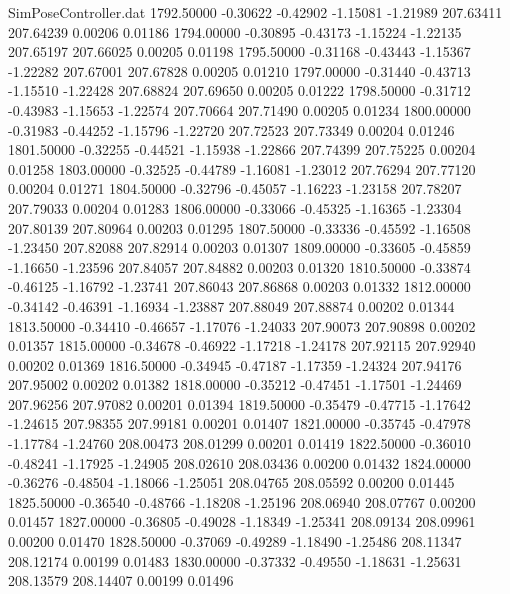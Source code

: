 \begin{filecontents}{SimPoseController.dat}
1792.50000   -0.30622   -0.42902    -1.15081   -1.21989  207.63411  207.64239    0.00206    0.01186
1794.00000   -0.30895   -0.43173    -1.15224   -1.22135  207.65197  207.66025    0.00205    0.01198
1795.50000   -0.31168   -0.43443    -1.15367   -1.22282  207.67001  207.67828    0.00205    0.01210
1797.00000   -0.31440   -0.43713    -1.15510   -1.22428  207.68824  207.69650    0.00205    0.01222
1798.50000   -0.31712   -0.43983    -1.15653   -1.22574  207.70664  207.71490    0.00205    0.01234
1800.00000   -0.31983   -0.44252    -1.15796   -1.22720  207.72523  207.73349    0.00204    0.01246
1801.50000   -0.32255   -0.44521    -1.15938   -1.22866  207.74399  207.75225    0.00204    0.01258
1803.00000   -0.32525   -0.44789    -1.16081   -1.23012  207.76294  207.77120    0.00204    0.01271
1804.50000   -0.32796   -0.45057    -1.16223   -1.23158  207.78207  207.79033    0.00204    0.01283
1806.00000   -0.33066   -0.45325    -1.16365   -1.23304  207.80139  207.80964    0.00203    0.01295
1807.50000   -0.33336   -0.45592    -1.16508   -1.23450  207.82088  207.82914    0.00203    0.01307
1809.00000   -0.33605   -0.45859    -1.16650   -1.23596  207.84057  207.84882    0.00203    0.01320
1810.50000   -0.33874   -0.46125    -1.16792   -1.23741  207.86043  207.86868    0.00203    0.01332
1812.00000   -0.34142   -0.46391    -1.16934   -1.23887  207.88049  207.88874    0.00202    0.01344
1813.50000   -0.34410   -0.46657    -1.17076   -1.24033  207.90073  207.90898    0.00202    0.01357
1815.00000   -0.34678   -0.46922    -1.17218   -1.24178  207.92115  207.92940    0.00202    0.01369
1816.50000   -0.34945   -0.47187    -1.17359   -1.24324  207.94176  207.95002    0.00202    0.01382
1818.00000   -0.35212   -0.47451    -1.17501   -1.24469  207.96256  207.97082    0.00201    0.01394
1819.50000   -0.35479   -0.47715    -1.17642   -1.24615  207.98355  207.99181    0.00201    0.01407
1821.00000   -0.35745   -0.47978    -1.17784   -1.24760  208.00473  208.01299    0.00201    0.01419
1822.50000   -0.36010   -0.48241    -1.17925   -1.24905  208.02610  208.03436    0.00200    0.01432
1824.00000   -0.36276   -0.48504    -1.18066   -1.25051  208.04765  208.05592    0.00200    0.01445
1825.50000   -0.36540   -0.48766    -1.18208   -1.25196  208.06940  208.07767    0.00200    0.01457
1827.00000   -0.36805   -0.49028    -1.18349   -1.25341  208.09134  208.09961    0.00200    0.01470
1828.50000   -0.37069   -0.49289    -1.18490   -1.25486  208.11347  208.12174    0.00199    0.01483
1830.00000   -0.37332   -0.49550    -1.18631   -1.25631  208.13579  208.14407    0.00199    0.01496

\end{filecontents}
